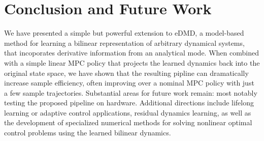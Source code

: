 \documentclass{article}
\begin{document}
      \section{Conclusion and Future Work} \label{sec:conclusion}
      We have presented a simple but powerful extension to eDMD, a model-based method for learning
      a bilinear representation of arbitrary dynamical systems, that incoporates derivative 
      information from an analytical mode. When combined with a simple linear
      MPC policy that projects the learned dynamics back into the original state space, we have 
      shown that the resulting pipline can dramatically increase sample efficiency, often 
      improving over a nominal MPC policy with just a few sample trajectories. Substantial areas 
      for future work remain: most notably testing the proposed pipeline on hardware. Additional 
      directions include lifelong learning or adaptive control applications, residual dynamics 
      learning, as well as the development of specialized numerical methods for solving nonlinear 
      optimal control problems using the learned bilinear dynamics.
      
      
      
      
\end{document}
